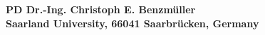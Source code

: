 \documentclass[10pt]{article}
\begin{document}



\vspace*{-3cm}

\begin{center} \bf
         {\Large PD Dr.-Ing. Christoph E. Benzm\"uller} \\[.5em] %
Saarland University, 66041 Saarbr\"ucken, Germany
\end{center}
\end{document}
